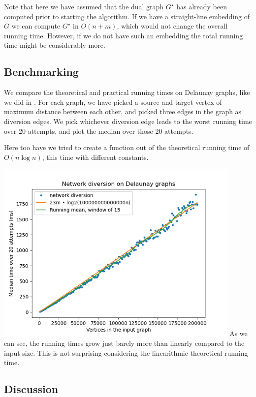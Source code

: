 Note that here we have assumed that the dual graph $G^\star$ has already been computed prior to starting the algorithm. If we have a straight-line embedding of $G$ we can compute $G^\star$ in $O(n+m)$, which would not change the overall running time. However, if we do not have such an embedding the total running time might be considerably more.

\subsection{Benchmarking}
We compare the theoretical and practical running times on Delaunay graphs, like we did in . For each graph, we have picked a source and target vertex of maximum distance between each other, and picked three edges in the graph as diversion edges. We pick whichever diversion edge leads to the worst running time over 20 attempts, and plot the median over those 20 attempts.

Here too have we tried to create a function out of the theoretical running time of $O(n \log n)$, this time with different constants.

\includegraphics[width=12cm]{figures/bench_plots/network diversion.png}
As we can see, the running times grow just barely more than linearly compared to the input size. This is not surprising considering the linearithmic theoretical running time.



\subsection{Discussion}

